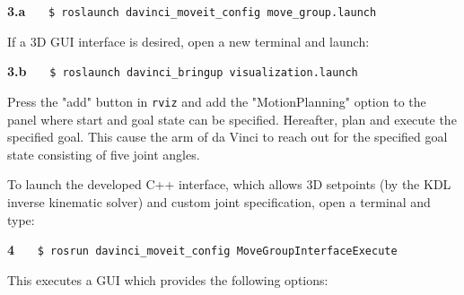 \hspace{1cm} \textbf{3.a} \ \ \  \texttt{\$ roslaunch davinci\_moveit\_config move\_group.launch} \ \ \ {} 

If a 3D GUI interface is desired, open a new terminal and launch:

\hspace{1cm} \textbf{3.b} \ \ \  \texttt{\$ roslaunch davinci\_bringup visualization.launch} \ \ \ {} 

Press the "add" button in \texttt{rviz} and add the "MotionPlanning" option to the panel where start and goal state can be specified. Hereafter, plan and execute the specified goal. This cause the arm of da Vinci to reach out for the specified goal state consisting of five joint angles.

To launch the developed C++ interface, which allows 3D setpoints (by the KDL inverse kinematic solver) and custom joint specification, open a terminal and type:

\hspace{1cm} \textbf{4} \ \ \  \texttt{\$ rosrun davinci\_moveit\_config MoveGroupInterfaceExecute} \ \ \ {\color{RoyalBlue}{\textit{}}} 

This executes a GUI which provides the following options:

